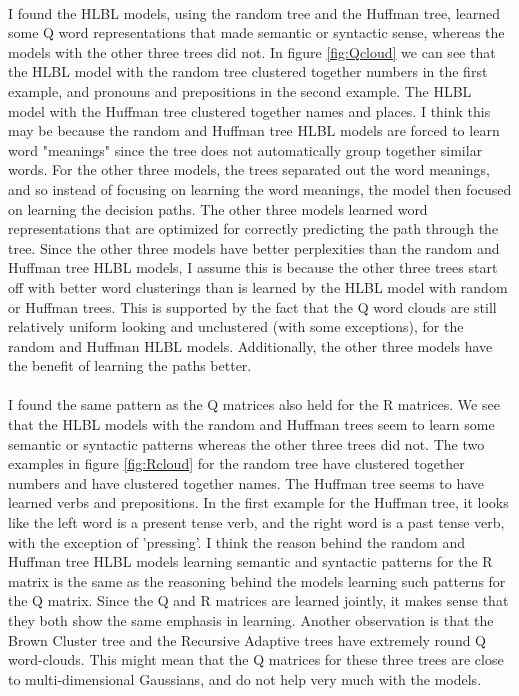 \paragraph{}
I found the HLBL models, using the random tree and the Huffman tree, learned some Q word representations that made semantic or syntactic sense, whereas the models with the other three trees did not. In figure \ref{fig:Qcloud} we can see that the HLBL model with the random tree clustered together numbers in the first example, and pronouns and prepositions in the second example. The HLBL model with the Huffman tree clustered together names and places. I think this may be because the random and Huffman tree HLBL models are forced to learn word "meanings" since the tree does not automatically group together similar words. For the other three models, the trees separated out the word meanings, and so instead of focusing on learning the word meanings, the model then focused on learning the decision paths. The other three models learned word representations that are optimized for correctly predicting the path through the tree. Since the other three models have better perplexities than the random and Huffman tree HLBL models, I assume this is because the other three trees start off with better word clusterings than is learned by the HLBL model with random or Huffman trees. This is supported by the fact that the Q word clouds are still relatively uniform looking and unclustered (with some exceptions), for the random and Huffman HLBL models. Additionally, the other three models have the benefit of learning the paths better.
\paragraph{}
I found the same pattern as the Q matrices also held for the R matrices. We see that the HLBL models with the random and Huffman trees seem to learn some semantic or syntactic patterns whereas the other three trees did not. The two examples in figure \ref{fig:Rcloud} for the random tree have clustered together numbers and have clustered together names. The Huffman tree seems to have learned verbs and prepositions. In the first example for the Huffman tree, it looks like the left word is a present tense verb, and the right word is a past tense verb, with the exception of 'pressing'. I think the reason behind the random and Huffman tree HLBL models learning semantic and syntactic patterns for the R matrix is the same as the reasoning behind the models learning such patterns for the Q matrix. Since the Q and R matrices are learned jointly, it makes sense that they both show the same emphasis in learning. Another observation is that the Brown Cluster tree and the Recursive Adaptive trees have extremely round Q word-clouds. This might mean that the Q matrices for these three trees are close to multi-dimensional Gaussians, and do not help very much with the models.

